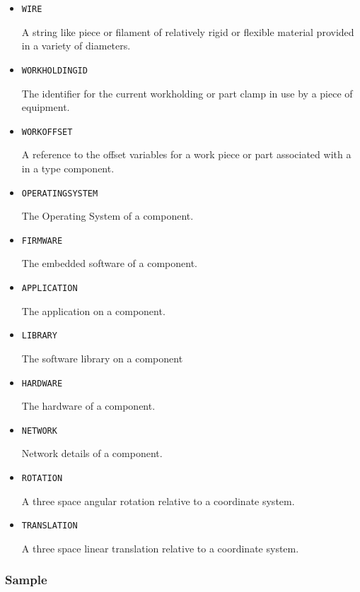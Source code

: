 \begin{itemize}
\item \texttt{WIRE}  

A string like piece or filament of relatively rigid or flexible material provided in a variety of diameters.


\item \texttt{WORKHOLDING\textunderscore ID}  

The identifier for the current workholding or part clamp in use by a piece of equipment.


\item \texttt{WORK\textunderscore OFFSET}  

A reference to the offset variables for a work piece or part associated with a  in a  type component.


\item \texttt{OPERATING\textunderscore SYSTEM}  

The Operating System of a component.


\item \texttt{FIRMWARE}  

The embedded software of a component.



\item \texttt{APPLICATION}  

The application on a component.


\item \texttt{LIBRARY}  

The software library on a component


\item \texttt{HARDWARE}  

The hardware of a component.



\item \texttt{NETWORK}  

Network details of a component.


\item \texttt{ROTATION}  

A three space angular rotation relative to a coordinate system.


\item \texttt{TRANSLATION}  

A three space linear translation relative to a coordinate system.

\end{itemize}


\subsubsection{Sample}
\label{sec:Sample}



